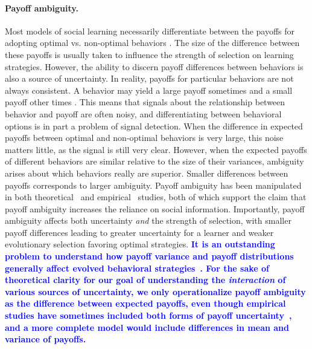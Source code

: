 \documentclass[letterpaper,11.5pt]{scrartcl}
\newcommand{\edit}[1]{{\bfseries \textcolor{blue} {#1}}}
\begin{document}
\paragraph{Payoff ambiguity.} Most models of social learning necessarily differentiate between the payoffs for adopting optimal vs. non-optimal behaviors
\citep{BoydRicherson1985,Rogers1988,Enquist2007,Rendell2010,aoki2014evolution}. The size of the difference between these payoffs is usually taken to influence the strength of selection on learning strategies.
However, the ability to discern payoff differences between behaviors is also a source of uncertainty. In reality, payoffs for particular behaviors are not always consistent. A behavior may yield a large payoff sometimes and a small
payoff other times \citep{McElreath2005}. This means that signals about the
relationship between behavior and payoff are often noisy, and differentiating
between behavioral options is in part a problem of signal detection. When the
difference in expected payoffs between optimal and non-optimal behaviors is very
large, this noise matters little, as the signal is still very clear. However, when
the expected payoffs of different behaviors are similar relative to the size of
their variances, ambiguity arises about which behaviors really are superior.
Smaller differences between payoffs corresponds to larger ambiguity. Payoff
ambiguity has been manipulated in both theoretical~\citep{perreault2012bayesian}
and empirical~\citep{McElreath2005,Toyokawa2019} studies, both of which support the
claim that payoff ambiguity increases the reliance on social information.
Importantly, payoff ambiguity %
affects both uncertainty \emph{and} the strength of selection, with smaller payoff differences leading to greater uncertainty for a learner and weaker evolutionary selection favoring optimal strategies. 
\edit{It is an outstanding problem to understand how payoff variance and payoff
distributions generally affect evolved behavioral strategies~\citep{Haaland2019}.
For the sake of theoretical clarity for our goal of understanding the
\emph{interaction} of various sources of uncertainty, we only operationalize payoff
ambiguity as the difference between expected payoffs, even though empirical studies
have sometimes included both forms of payoff uncertainty~\citep{McElreath2005,Toyokawa2019}, and a more complete model would include differences in mean and variance of payoffs.}

\end{document}

